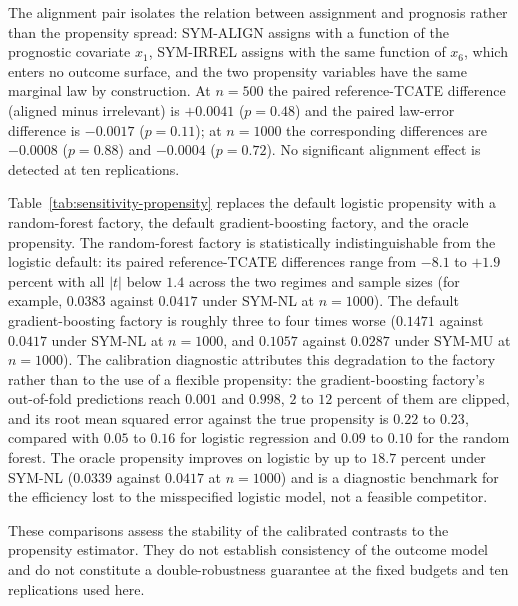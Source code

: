 

The alignment pair isolates the relation between assignment and prognosis rather than the propensity spread: SYM-ALIGN assigns with a function of the prognostic covariate $x_1$, SYM-IRREL assigns with the same function of $x_6$, which enters no outcome surface, and the two propensity variables have the same marginal law by construction. At $n=500$ the paired reference-TCATE difference (aligned minus irrelevant) is $+0.0041$ ($p=0.48$) and the paired law-error difference is $-0.0017$ ($p=0.11$); at $n=1000$ the corresponding differences are $-0.0008$ ($p=0.88$) and $-0.0004$ ($p=0.72$). No significant alignment effect is detected at ten replications.

Table~\ref{tab:sensitivity-propensity} replaces the default logistic propensity with a random-forest factory, the default gradient-boosting factory, and the oracle propensity. The random-forest factory is statistically indistinguishable from the logistic default: its paired reference-TCATE differences range from $-8.1$ to $+1.9$ percent with all $|t|$ below $1.4$ across the two regimes and sample sizes (for example, $0.0383$ against $0.0417$ under SYM-NL at $n=1000$). The default gradient-boosting factory is roughly three to four times worse ($0.1471$ against $0.0417$ under SYM-NL at $n=1000$, and $0.1057$ against $0.0287$ under SYM-MU at $n=1000$). The calibration diagnostic attributes this degradation to the factory rather than to the use of a flexible propensity: the gradient-boosting factory's out-of-fold predictions reach $0.001$ and $0.998$, $2$ to $12$ percent of them are clipped, and its root mean squared error against the true propensity is $0.22$ to $0.23$, compared with $0.05$ to $0.16$ for logistic regression and $0.09$ to $0.10$ for the random forest. The oracle propensity improves on logistic by up to $18.7$ percent under SYM-NL ($0.0339$ against $0.0417$ at $n=1000$) and is a diagnostic benchmark for the efficiency lost to the misspecified logistic model, not a feasible competitor.



These comparisons assess the stability of the calibrated contrasts to the propensity estimator. They do not establish consistency of the outcome model and do not constitute a double-robustness guarantee at the fixed budgets and ten replications used here.
